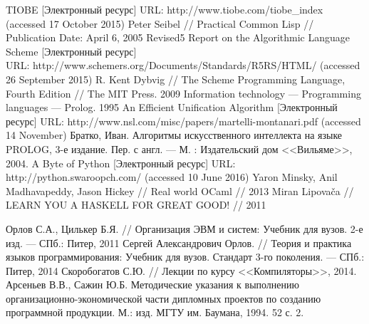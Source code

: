 \begin{thebibliography}{0}
    TIOBE [Электронный ресурс] URL: http://www.tiobe.com/tiobe\_index (accessed 17 October 2015)
    Peter Seibel // Practical Common Lisp // Publication Date: April 6, 2005
    Revised5 Report on the Algorithmic Language Scheme [Электронный ресурс] \\ URL: http://www.schemers.org/Documents/Standards/R5RS/HTML/ (accessed 26 September 2015)
    R. Kent Dybvig // The Scheme Programming Language, Fourth Edition // The MIT Press. 2009
    Information technology — Programming languages — Prolog. 1995
    An Efficient Unification Algorithm [Электронный ресурс] URL: http://www.nsl.com/misc/papers/martelli-montanari.pdf (accessed 14 November)
    Братко, Иван. Алгоритмы искусственного интеллекта на языке PROLOG, 3-е издание. Пер. с англ. --- М. : Издательский дом <<Вильяме>>, 2004.
    A Byte of Python [Электронный ресурс] URL: http://python.swaroopch.com/ (accessed 10 June 2016)
    Yaron Minsky, Anil Madhavapeddy, Jason Hickey // Real world OCaml // 2013
    Miran Lipovača // LEARN YOU A HASKELL FOR GREAT GOOD! // 2011 

     Орлов С.А., Цилькер Б.Я. // Организация ЭВМ и систем: Учебник для вузов. 2-е изд. --- СПб.: Питер, 2011
     Сергей Александрович Орлов. // Теория и практика языков программирования: Учебник для вузов. Стандарт 3-го поколения. --- СПб.: Питер, 2014
     Скоробогатов С.Ю. // Лекции по курсу <<Компиляторы>>, 2014.
     Арсеньев В.В., Сажин Ю.Б. Методические указания к выполнению организационно-экономической части дипломных проектов по созданию программной продукции. М.: изд. МГТУ им. Баумана, 1994. 52 с. 2.
\end{thebibliography}
